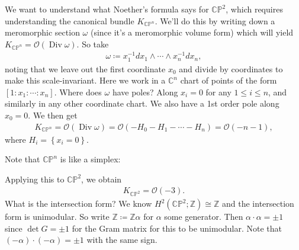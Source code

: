 \begin{remark}

We want to understand what Noether's formula says for
\({\mathbb{CP}}^2\), which requires understanding the canonical bundle
\(K_{{\mathbb{CP}}^n}\). We'll do this by writing down a meromorphic
section \(\omega\) (since it's a meromorphic volume form) which will
yield \(K_{{\mathbb{CP}}^n} = {\mathcal{O}}(\operatorname{Div}\omega)\).
So take
\begin{align*}
\omega \coloneqq x_1^{-1}dx_1 \wedge \cdots \wedge x_n^{-1}dx_n 
,\end{align*}
noting that we leave out the first coordinate \(x_0\) and divide by
coordinates to make this scale-invariant. Here we work in a
\({\mathbb{C}}^n\) chart of points of the form
\([1: x_1 : \cdots : x_n]\). Where does \(\omega\) have poles? Along
\(x_i = 0\) for any \(1\leq i \leq n\), and similarly in any other
coordinate chart. We also have a 1st order pole along \(x_0 = 0\). We
then get
\begin{align*}
K_{{\mathbb{CP}}^n} = {\mathcal{O}}(\operatorname{Div}\omega) = {\mathcal{O}}( -H_0 -H_1 - \cdots - H_n) = {\mathcal{O}}(-n-1)
,\end{align*}
where \(H_i = \left\{{x_i = 0}\right\}\).

Note that \({\mathbb{CP}}^n\) is like a simplex:

\begin{figure}
\centering
{}
\end{figure}

Applying this to \({\mathbb{CP}}^2\), we obtain
\begin{align*}
K_{{\mathbb{CP}}^2} = {\mathcal{O}}(-3)
.\end{align*}
What is the intersection form? We know
\(H^2({\mathbb{CP}}^2; {\mathbb{Z}}) \cong {\mathbb{Z}}\) and the
intersection form is unimodular. So write
\({\mathbb{Z}}\coloneqq{\mathbb{Z}}\alpha\) for \(\alpha\) some
generator. Then \(\alpha \cdot \alpha = \pm 1\) since \(\det G = \pm 1\)
for the Gram matrix for this to be unimodular. Note that
\((- \alpha) \cdot (- \alpha) = \pm 1\) with the same sign.

\begin{claim}


\end{claim}
\end{remark}
